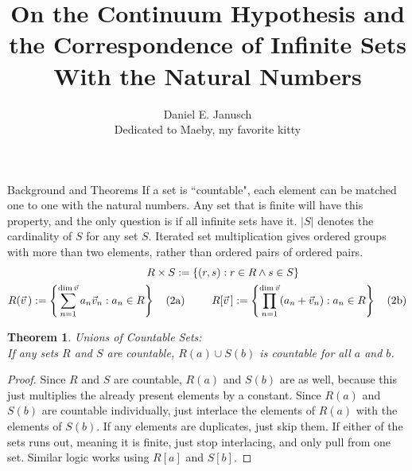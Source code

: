 \documentclass[12pt]{article}
\newtheorem{thm}{Theorem}
\begin{document}
\title{On the Continuum Hypothesis and the Correspondence of Infinite Sets With the Natural Numbers}
\author{Daniel E. Janusch\\Dedicated to Maeby, my favorite kitty}
\maketitle

\begin{section}{Background and Theorems}\label{sec:background}
	If a set is ``countable",  each element can be matched one to one with the natural numbers. Any
	set that is finite will have this property, and the only question is if all infinite sets have it.
	$|S|$ denotes the cardinality of $S$ for any set $S$. Iterated set multiplication gives ordered
	groups with more than two elements, rather than ordered pairs of ordered pairs.\\
	\begin{align}
		R\times S & :=\{(r,s):r\in R\land s\in S\}\\
		R(\vec v\,):=\left\{\sum_{n=1}^{\dim\vec v}a_n\vec v_n:a_n\in R\right\}~~~(2 & \text a)
		\hspace{2.5em}
		R[\vec v\,]:=\left\{\prod_{n=1}^{\dim\vec v}(a_n+\vec v_n):a_n\in R\right\}~~~(2\text b)
	\end{align}

	\begin{thm}\label{thm:finite unions}
		\emph{Unions of Countable Sets:}\\
		\indent\emph{If any sets $R$ and $S$ are countable, $R(a)\cup S(b)$ is countable for all $a$ and $b$.}
	\end{thm}\begin{proof}
		Since $R$ and $S$ are countable, $R(a)$ and $S(b)$ are as well, because this just multiplies
		the already present elements by a constant. Since $R(a)$ and $S(b)$ are countable individually,
		just interlace the elements of $R(a)$ with the elements of $S(b)$. If any elements are duplicates,
		just skip them. If either of the sets runs out, meaning it is finite, just stop interlacing, and
		only pull from one set. Similar logic works using $R[a]$ and $S[b]$.
	\end{proof}


\end{section}
\end{document}
